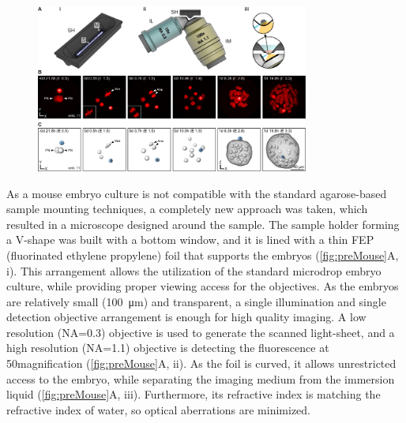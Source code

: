     \begin{figure}[tb]
      \centering
      \includegraphics[width=0.8\textwidth]{mammals/Figure2}
      \label{fig:preMouse}
    \end{figure}

    As a mouse embryo culture is not compatible with the standard agarose-based sample mounting techniques, a completely new approach was taken, which resulted in a microscope designed around the sample. The sample holder forming a V-shape was built with a bottom window, and it is lined with a thin FEP (fluorinated ethylene propylene) foil that supports the embryos (\autoref{fig:preMouse}A, i). This arrangement allows the utilization of the standard microdrop embryo culture, while providing proper viewing access for the objectives. As the embryos are relatively small (\SI{100}{\micro m}) and transparent, a single illumination and single detection objective arrangement is enough for high quality imaging. A low resolution (NA=0.3) objective is used to generate the scanned light-sheet, and a high resolution (NA=1.1) objective is detecting the fluorescence at 50\texttimes magnification (\autoref{fig:preMouse}A, ii). As the foil is curved, it allows unrestricted access to the embryo, while separating the imaging medium from the immersion liquid (\autoref{fig:preMouse}A, iii). Furthermore, its refractive index is matching the refractive index of water, so optical aberrations are minimized.

